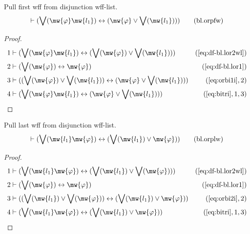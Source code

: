 \begin{lemma} Pull first wff from disjunction wff-list.
\begin{align}
\vdash ( \bigvee( \mw{\varphi} \mw{l_1} ) \leftrightarrow ( \mw{\varphi} \vee \bigvee(
    \mw{l_1} ) ) )\label{eq:bl.orpfw}\tag{bl.orpfw}
\end{align}
\end{lemma}

\begin{proof}
\begin{align}
  1 & \vdash ( \bigvee( \mw{\varphi} \mw{l_1} ) \leftrightarrow ( \bigvee(
    \mw{\varphi} ) \vee \bigvee( \mw{l_1} ) )
    )&(\mbox{\ref{eq:df-bl.lor2wl}})\notag
  \\ 2 & \vdash ( \bigvee( \mw{\varphi} ) \leftrightarrow \mw{\varphi}
    )&(\mbox{\ref{eq:df-bl.lor1}})\notag
  \\ 3 & \vdash ( ( \bigvee( \mw{\varphi} ) \vee \bigvee( \mw{l_1} ) )
    \leftrightarrow ( \mw{\varphi} \vee \bigvee( \mw{l_1} ) )
    )&(\mbox{\ref{eq:orbi1i}},2)\notag
  \\ 4 & \vdash ( \bigvee( \mw{\varphi} \mw{l_1} ) \leftrightarrow ( \mw{\varphi}
    \vee \bigvee( \mw{l_1} ) )
    )&(\mbox{\ref{eq:bitri}},1,3)\notag
\end{align}
\end{proof}

\begin{lemma} Pull last wff from disjunction wff-list.
\begin{align}
\vdash ( \bigvee( \mw{l_1} \mw{\varphi} ) \leftrightarrow ( \bigvee( \mw{l_1} ) \vee
    \mw{\varphi} ) )\label{eq:bl.orplw}\tag{bl.orplw}
\end{align}
\end{lemma}

\begin{proof}
\begin{align}
  1 & \vdash ( \bigvee( \mw{l_1} \mw{\varphi} ) \leftrightarrow ( \bigvee(
    \mw{l_1} ) \vee \bigvee( \mw{\varphi} ) )
    )&(\mbox{\ref{eq:df-bl.lor2wl}})\notag
  \\ 2 & \vdash ( \bigvee( \mw{\varphi} ) \leftrightarrow \mw{\varphi}
    )&(\mbox{\ref{eq:df-bl.lor1}})\notag
  \\ 3 & \vdash ( ( \bigvee( \mw{l_1} ) \vee \bigvee( \mw{\varphi} ) )
    \leftrightarrow ( \bigvee( \mw{l_1} ) \vee \mw{\varphi} )
    )&(\mbox{\ref{eq:orbi2i}},2)\notag
  \\ 4 & \vdash ( \bigvee( \mw{l_1} \mw{\varphi} ) \leftrightarrow ( \bigvee(
    \mw{l_1} ) \vee \mw{\varphi} )
    )&(\mbox{\ref{eq:bitri}},1,3)\notag
\end{align}
\end{proof}

